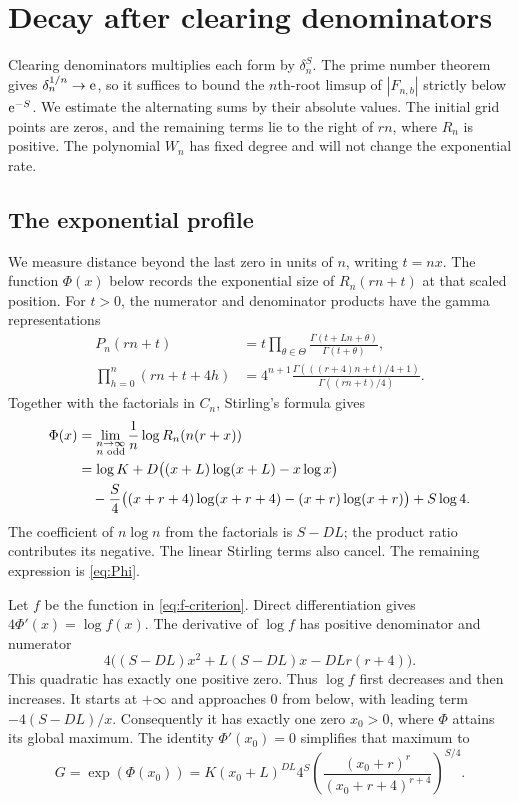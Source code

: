 \section{Decay after clearing denominators}\label{sec:decay}

Clearing denominators multiplies each form by $\delta_n^S$.
The prime number theorem gives $\delta_n^{1/n}\to\mathrm e$, so it
suffices to bound the $n$th-root limsup of $|F_{n,b}|$ strictly below
$\mathrm e^{-S}$. We estimate the alternating sums by their absolute
values. The initial grid points are zeros,
and the remaining terms lie to the right of $rn$, where $R_n$ is
positive. The polynomial $W_n$ has fixed degree and will not change
the exponential rate.

\subsection{The exponential profile}

We measure distance beyond the last zero in units of $n$, writing
$t=nx$. The function $\Phi(x)$ below records the exponential
size of $R_n(rn+t)$ at that scaled position.
For $t>0$, the numerator and denominator products have the gamma
representations
\begin{align*}
 P_n(rn+t)&=t\prod_{\theta\in\Theta}
                  \frac{\Gamma(t+Ln+\theta)}{\Gamma(t+\theta)},\\
 \prod_{h=0}^n(rn+t+4h)
   &=4^{n+1}\frac{\Gamma(((r+4)n+t)/4+1)}{\Gamma((rn+t)/4)}.
\end{align*}
Together with the factorials in $C_n$, Stirling's formula gives
\begin{align}
 \Phi(x)&=\lim_{\substack{n\to\infty\\n\text{ odd}}}
                    \frac1n\log R_n(n(r+x))\notag\\
 &=\log K+D\bigl((x+L)\log(x+L)-x\log x\bigr)\notag\\
 &\quad-\frac S4\bigl((x+r+4)\log(x+r+4)
                         -(x+r)\log(x+r)\bigr)+S\log4.
 \label{eq:Phi}
\end{align}
The coefficient of $n\log n$ from the factorials is $S-DL$;
the product ratio contributes its negative. The linear Stirling
terms also cancel. The remaining expression is \eqref{eq:Phi}.

Let $f$ be the function in \eqref{eq:f-criterion}. Direct
differentiation gives $4\Phi'(x)=\log f(x)$. The derivative of
$\log f$ has positive denominator and numerator
\[
 4\bigl((S-DL)x^2+L(S-DL)x-DLr(r+4)\bigr).
\]
This quadratic has exactly one positive zero. Thus $\log f$ first
decreases and then increases. It starts at $+\infty$ and approaches
$0$ from below, with leading term $-4(S-DL)/x$. Consequently it
has exactly one zero $x_0>0$, where $\Phi$ attains its global
maximum. The identity $\Phi'(x_0)=0$ simplifies that maximum to
\begin{equation}\label{eq:G}
 G=\exp(\Phi(x_0))
  =K(x_0+L)^{DL}4^S
        \left(\frac{(x_0+r)^r}{(x_0+r+4)^{r+4}}\right)^{S/4}.
\end{equation}

